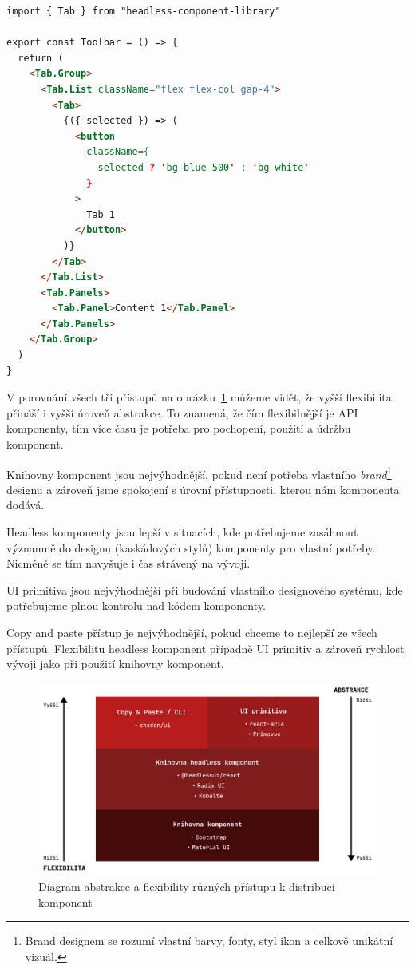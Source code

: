\begin{lstlisting}[caption={Ukázka použití headless knihovny}, label={component-distribution-2}, language=html]
import { Tab } from "headless-component-library"

export const Toolbar = () => {
  return (
    <Tab.Group>
      <Tab.List className="flex flex-col gap-4">
        <Tab>
          {({ selected }) => (
            <button
              className={
                selected ? 'bg-blue-500' : 'bg-white'
              }
            >
              Tab 1
            </button>
          )}
        </Tab>
      </Tab.List>
      <Tab.Panels>
        <Tab.Panel>Content 1</Tab.Panel>
      </Tab.Panels>
    </Tab.Group>
  )
}
\end{lstlisting}

V porovnání všech tří přístupů na obrázku~\ref{component-lib-distribution-comparison} můžeme vidět, že vyšší flexibilita přináší i vyšší úroveň abstrakce.
To znamená, že čím flexibilnější je API komponenty, tím více času je potřeba pro pochopení, použití a údržbu komponent.

Knihovny komponent jsou nejvýhodnější, pokud není potřeba vlastního \textit{brand}\footnote{Brand designem se rozumí vlastní barvy, fonty, styl ikon a celkově unikátní vizuál.} designu a zároveň jsme spokojení s úrovní přístupnosti, kterou nám komponenta dodává.

Headless komponenty jsou lepší v situacích, kde potřebujeme zasáhnout významně do designu (kaskádových stylů) komponenty pro vlastní potřeby.
Nicméně se tím navyšuje i čas strávený na vývoji.

UI primitiva jsou nejvýhodnější při budování vlastního designového systému, kde potřebujeme plnou kontrolu nad kódem komponenty.

Copy and paste přístup je nejvýhodnější, pokud chceme to nejlepší ze všech přístupů.
Flexibilitu headless komponent případně UI primitiv a zároveň rychlost vývoji jako při použití knihovny komponent.

\begin{figure}[h]
      \centering
      \includegraphics[width=\textwidth]{./assets/figures/component-lib-distribution-comparison.png}
      \captionsetup{justification=centering}
      \caption{Diagram abstrakce a flexibility různých přístupu k distribuci komponent}
      \label{component-lib-distribution-comparison}
\end{figure}

